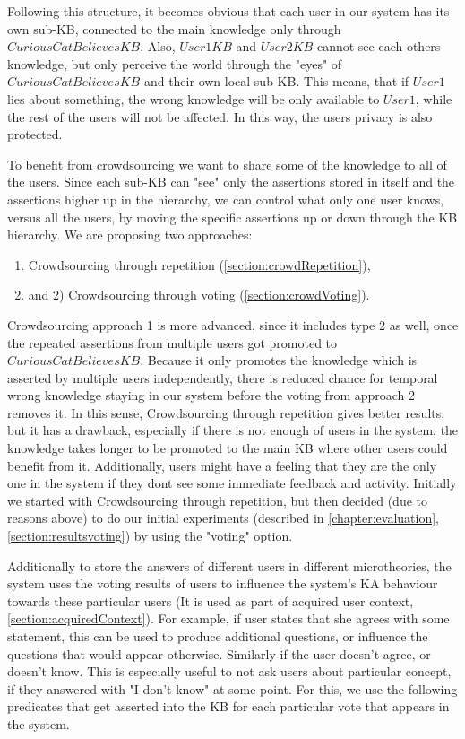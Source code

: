 Following this structure, it becomes obvious that each user in our system has 
its own sub-KB, connected to the main knowledge only through 
$CuriousCatBelievesKB$. Also, $User1KB$ and $User2KB$ cannot see each others 
knowledge, but only perceive the world through the "eyes" of 
$CuriousCatBelievesKB$ and their own local sub-KB. This means, that if $User1$ 
lies about something, the wrong knowledge will be only available to $User1$, 
while the rest of the users will not be affected. In this way, the users privacy
is also protected.

To benefit from crowdsourcing we want to share some of the knowledge to all of 
the users. Since each sub-KB can "see" only the assertions stored in itself and 
the assertions higher up in the hierarchy, we can control what only one user 
knows, versus all the users, by moving the specific assertions up or down 
through the KB hierarchy. 
We are proposing two approaches: 
\begin{enumerate}
\item Crowdsourcing through repetition (\autoref{section:crowdRepetition}),
\item and 2) Crowdsourcing through voting (\autoref{section:crowdVoting}).
\end{enumerate}
Crowdsourcing approach 1 is more advanced, since it includes type 2 as well, 
once the 
repeated assertions from multiple users got promoted to $CuriousCatBelievesKB$. 
Because it only promotes the knowledge which is asserted by multiple users 
independently, there is reduced chance for temporal wrong knowledge staying in 
our system before the voting from approach 2 removes it. In this sense, 
Crowdsourcing through repetition gives better results, but it has a drawback, 
especially if there is not enough of users in the system, the knowledge takes 
longer to be promoted to the main KB where other users could benefit from it. 
Additionally, users might have a feeling that they are the only one in the 
system if they dont see some immediate feedback and activity. 
Initially we started with Crowdsourcing through repetition, but then 
decided (due to reasons above) to do our initial experiments 
(described in \autoref{chapter:evaluation}, \autoref{section:resultsvoting}) 
by using the "voting" option.

Additionally to store the answers of different users in different microtheories,
the system uses the voting results of users to influence the system's KA 
behaviour towards these particular users (It is used as part of acquired user 
context, \autoref{section:acquiredContext}). For example, if user states that 
she agrees with some statement,
this can be used to produce additional questions, or influence the questions
that would appear otherwise. Similarly if the user doesn't agree, or doesn't
know. This is especially useful to not ask users about particular concept, if
they answered with "I don't know" at some point. For this, we use the following
predicates that get asserted into the KB for each particular vote that appears
in the system.

